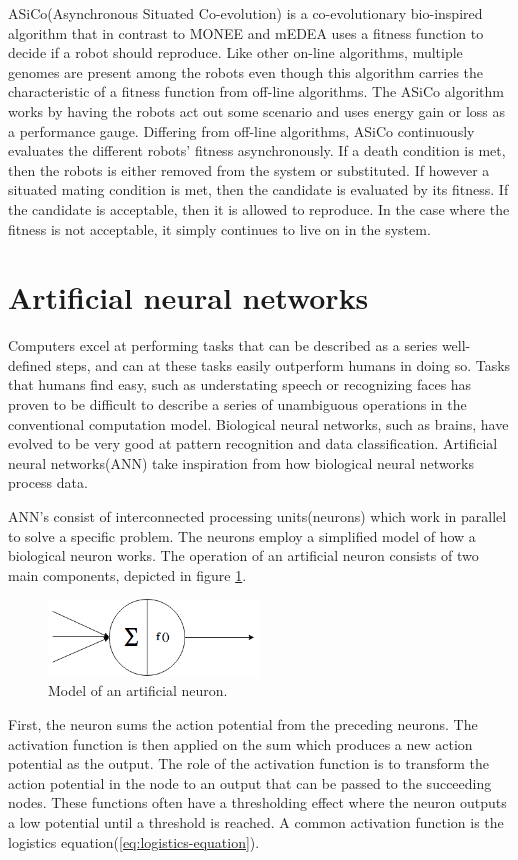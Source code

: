ASiCo(Asynchronous Situated Co-evolution) is a co-evolutionary bio-inspired algorithm that in contrast to MONEE and mEDEA uses a fitness function to decide if a robot should reproduce.
Like other on-line algorithms, multiple genomes are present among the robots even though this algorithm carries the characteristic of a fitness function from off-line algorithms.
The ASiCo algorithm works by having the robots act out some scenario and uses energy gain or loss as a performance gauge. 
Differing from off-line algorithms, ASiCo continuously evaluates the different robots' fitness asynchronously.
If a death condition is met, then the robots is either removed from the system or substituted. 
If however a situated mating condition is met, then the candidate is evaluated by its fitness.
If the candidate is acceptable, then it is allowed to reproduce.
In the case where the fitness is not acceptable, it simply continues to live on in the system.

\section{Artificial neural networks}
Computers excel at performing tasks that can be described as a series well-defined steps, and can at these tasks easily outperform humans in doing so.
Tasks that humans find easy, such as understating speech or recognizing faces has proven to be difficult to describe a series of unambiguous operations in the conventional computation model.
Biological neural networks, such as brains, have evolved to be very good at pattern recognition and data classification.
Artificial neural networks(ANN) take inspiration from how biological neural networks process data.

ANN's consist of interconnected processing units(neurons) which work in parallel to solve a specific problem.
The neurons employ a simplified model of how a biological neuron works.
The operation of an artificial neuron consists of two main components, depicted in figure \ref{fig:artificial-neuron}.

\begin{figure}[H]
	
	\centering
	\includegraphics[width=0.5\textwidth]{chapters/res/Neuron.png}
	\caption{Model of an artificial neuron.}
	\label{fig:artificial-neuron}
\end{figure}
First, the neuron sums the action potential from the preceding neurons.
The activation function is then applied on the sum which produces a new action potential as the output.
The role of the activation function is to transform the action potential in the node to an output that can be passed to the succeeding nodes.
These functions often have a thresholding effect where the neuron outputs a low potential until a threshold is reached.
A common activation function is the logistics equation(\ref{eq:logistics-equation}).

